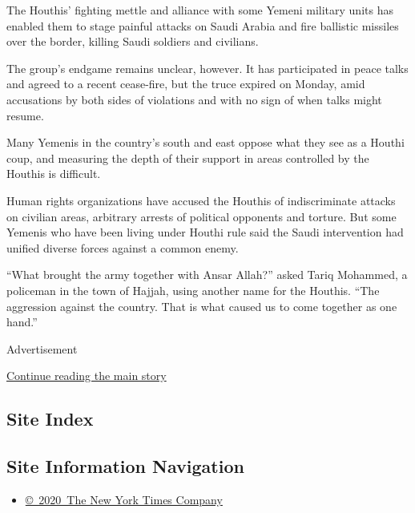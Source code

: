 The Houthis' fighting mettle and alliance with some Yemeni military
units has enabled them to stage painful attacks on Saudi Arabia and fire
ballistic missiles over the border, killing Saudi soldiers and
civilians.

The group's endgame remains unclear, however. It has participated in
peace talks and agreed to a recent cease-fire, but the truce expired on
Monday, amid accusations by both sides of violations and with no sign of
when talks might resume.

Many Yemenis in the country's south and east oppose what they see as a
Houthi coup, and measuring the depth of their support in areas
controlled by the Houthis is difficult.

Human rights organizations have accused the Houthis of indiscriminate
attacks on civilian areas, arbitrary arrests of political opponents and
torture. But some Yemenis who have been living under Houthi rule said
the Saudi intervention had unified diverse forces against a common
enemy.

``What brought the army together with Ansar Allah?'' asked Tariq
Mohammed, a policeman in the town of Hajjah, using another name for the
Houthis. ``The aggression against the country. That is what caused us to
come together as one hand.''

Advertisement

\protect\hyperlink{after-bottom}{Continue reading the main story}

\hypertarget{site-index}{%
\subsection{Site Index}\label{site-index}}

\hypertarget{site-information-navigation}{%
\subsection{Site Information
Navigation}\label{site-information-navigation}}

\begin{itemize}
\tightlist
\item
  \href{https://help.nytimes.com/hc/en-us/articles/115014792127-Copyright-notice}{©~2020~The
  New York Times Company}
\end{itemize}

